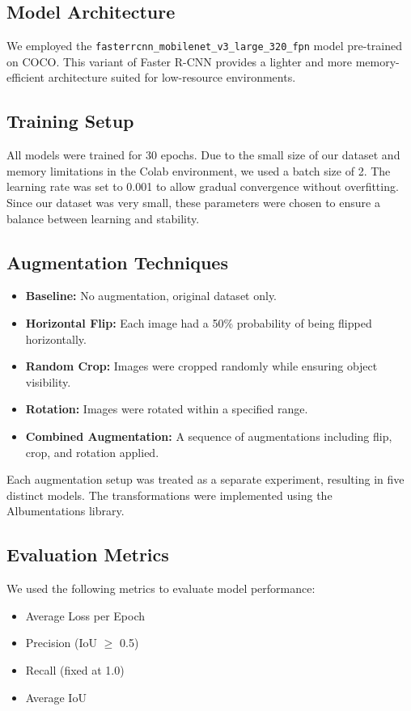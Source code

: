 \documentclass[12pt]{article}
\begin{document}
\subsection{Model Architecture}
We employed the \texttt{fasterrcnn\_mobilenet\_v3\_large\_320\_fpn} model pre-trained on COCO. This variant of Faster R-CNN provides a lighter and more memory-efficient architecture suited for low-resource environments.

\subsection{Training Setup}
All models were trained for 30 epochs. Due to the small size of our dataset and memory limitations in the Colab environment, we used a batch size of 2. The learning rate was set to 0.001 to allow gradual convergence without overfitting. Since our dataset was very small, these parameters were chosen to ensure a balance between learning and stability.

\subsection{Augmentation Techniques}
\begin{itemize}
\item \textbf{Baseline:} No augmentation, original dataset only.
\item \textbf{Horizontal Flip:} Each image had a 50\% probability of being flipped horizontally.
\item \textbf{Random Crop:} Images were cropped randomly while ensuring object visibility.
\item \textbf{Rotation:} Images were rotated within a specified range.
\item \textbf{Combined Augmentation:} A sequence of augmentations including flip, crop, and rotation applied.
\end{itemize}

Each augmentation setup was treated as a separate experiment, resulting in five distinct models. The transformations were implemented using the Albumentations library.

\subsection{Evaluation Metrics}
We used the following metrics to evaluate model performance:
\begin{itemize}
\item Average Loss per Epoch
\item Precision (IoU $\geq$ 0.5)
\item Recall (fixed at 1.0)
\item Average IoU
\end{itemize}
\end{document}

